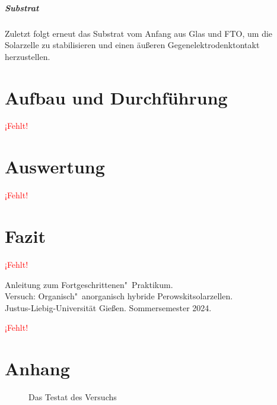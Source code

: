 \documentclass[12pt,a4paper,ngerman]{report}
\providecommand{\fehlt}{\textcolor{red}{{ ¡Fehlt! }}}
\begin{document}
	\paragraph{Substrat}
	Zuletzt folgt erneut das Substrat vom Anfang aus Glas und FTO, um die Solarzelle zu stabilisieren und einen äußeren Gegenelektrodenktontakt herzustellen.
	
		



	

\chapter{Aufbau und Durchführung}
	\fehlt
	
	


\chapter{Auswertung}
	\fehlt
\chapter{Fazit}
	\fehlt

\listoffigures%
	
\begin{thebibliography}{111}%
	Anleitung zum Fortgeschrittenen"~Praktikum.\\ \glqq Versuch: Organisch"~anorganisch hybride Perowskitsolarzellen\grqq.\\ Justus-Liebig-Universität Gießen. Sommersemester 2024.
	
		\fehlt
	\end{thebibliography}


\chapter*{Anhang}\label{ch:Anhang}
\FloatBarrier
	\begin{figure}[ht]
	\centering
	\caption[Testat]{Das Testat des Versuchs}
	\label{fig:Testat}
\end{figure}
\end{document}
